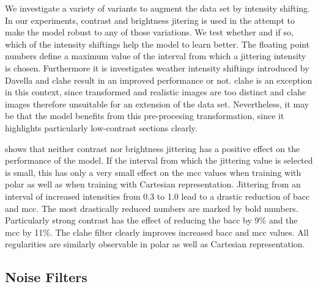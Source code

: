 We investigate a variety of variants to augment the data set by intensity shifting. In our experiments, contrast and brightness jitering is used in the attempt to make the model robust to any of those variations. We test whether and if so, which of the intensity shiftings help the model to learn better. The floating point numbers define a maximum value of the interval from which a jittering intensity is chosen. Furthermore it is investigates weather intensity shiftings introduced by Davella and \acrshort{clahe} result in an improved performance or not. \Acrshort{clahe} is an exception in this context, since transformed and realistic images are too distinct and \acrshort{clahe} images therefore unsuitable for an extension of the data set. Nevertheless, it may be that the model benefits from this pre-procesing transformation, since it highlights particularly low-contrast sections clearly.

 shows that neither contrast nor brightness jittering has a positive effect on the performance of the model. If the interval from which the jittering value is selected is small, this has only a very small effect on the \acrshort{mcc} values when training with polar as well as when training with Cartesian representation. Jittering from an interval of increased intensities from 0.3 to 1.0 lead to a drastic reduction of \acrshort{bacc} and \acrshort{mcc}. The most drastically reduced numbers are marked by bold numbers. Particularly strong contrast has the effect of reducing the \acrshort{bacc} by 9\% and the \acrshort{mcc} by 11\%. The \acrshort{clahe} filter clearly improves increased \acrshort{bacc} and \acrshort{mcc} values. All regularities are similarly observable in polar as well as Cartesian representation.


\subsection{Noise Filters}

